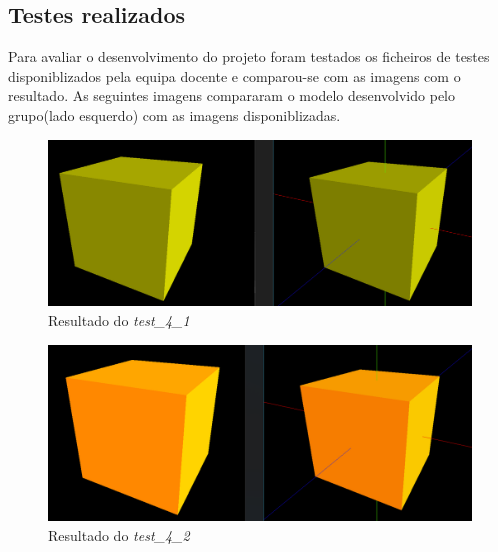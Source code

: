 \documentclass[runningheads]{llncs}
\begin{document}
    
    
    

    \subsection{Testes realizados}
    Para avaliar o desenvolvimento do projeto foram testados os ficheiros de testes disponiblizados
    pela equipa docente e comparou-se com as imagens com o resultado. As seguintes imagens compararam
    o modelo desenvolvido pelo grupo(lado esquerdo) com as imagens disponiblizadas.

    \begin{landscape}
        \begin{figure}
            \centering
            \includegraphics[width=\linewidth]{assets/testes/teste_4_1.png}
            \caption{Resultado do \textit{test_4_1}} \label{fig:teste_4_1}
        \end{figure}
    \end{landscape}

    \begin{landscape}
        \begin{figure}
            \centering
            \includegraphics[width=\linewidth]{assets/testes/teste_4_2.png}
            \caption{Resultado do \textit{test_4_2}} \label{fig:teste_4_2}
        \end{figure}
    \end{landscape}
\end{document}
